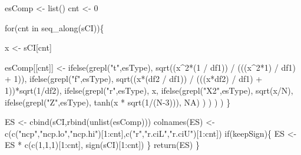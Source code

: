 \documentclass[]{article}
\newenvironment{Shaded}{\begin{snugshade}}{\end{snugshade}}
\newcommand{\KeywordTok}[1]{\textcolor[rgb]{0.94,0.87,0.69}{{#1}}}
\newcommand{\DecValTok}[1]{\textcolor[rgb]{0.86,0.86,0.80}{{#1}}}
\newcommand{\StringTok}[1]{\textcolor[rgb]{0.80,0.58,0.58}{{#1}}}
\newcommand{\OtherTok}[1]{\textcolor[rgb]{0.94,0.94,0.56}{{#1}}}
\newcommand{\NormalTok}[1]{\textcolor[rgb]{0.80,0.80,0.80}{{#1}}}
\begin{document}
\begin{Shaded}
\begin{Highlighting}[]
    \NormalTok{esComp <-}\StringTok{ }\KeywordTok{list}\NormalTok{()}
    \NormalTok{cnt <-}\StringTok{ }\DecValTok{0}

    \NormalTok{for(cnt in }\KeywordTok{seq_along}\NormalTok{(sCI))\{}

        \NormalTok{x <-}\StringTok{ }\NormalTok{sCI[cnt]}

        \NormalTok{esComp[[cnt]] <-}\StringTok{ }\KeywordTok{ifelse}\NormalTok{(}\KeywordTok{grepl}\NormalTok{(}\StringTok{"t"}\NormalTok{,esType), }\KeywordTok{sqrt}\NormalTok{((x^}\DecValTok{2}\NormalTok{*(}\DecValTok{1} \NormalTok{/}\StringTok{ }\NormalTok{df1)) /}\StringTok{ }\NormalTok{(((x^}\DecValTok{2}\NormalTok{*}\DecValTok{1}\NormalTok{) /}\StringTok{ }\NormalTok{df1) +}\StringTok{ }\DecValTok{1}\NormalTok{)),}
                                \KeywordTok{ifelse}\NormalTok{(}\KeywordTok{grepl}\NormalTok{(}\StringTok{"f"}\NormalTok{,esType), }\KeywordTok{sqrt}\NormalTok{((x*(df2 /}\StringTok{ }\NormalTok{df1)) /}\StringTok{ }\NormalTok{(((x*df2) /}\StringTok{ }\NormalTok{df1) +}\StringTok{ }\DecValTok{1}\NormalTok{))*}\KeywordTok{sqrt}\NormalTok{(}\DecValTok{1}\NormalTok{/df2),}
                                       \KeywordTok{ifelse}\NormalTok{(}\KeywordTok{grepl}\NormalTok{(}\StringTok{"r"}\NormalTok{,esType), x,}
                                              \KeywordTok{ifelse}\NormalTok{(}\KeywordTok{grepl}\NormalTok{(}\StringTok{"X2"}\NormalTok{,esType), }\KeywordTok{sqrt}\NormalTok{(x/N),}
                                                     \KeywordTok{ifelse}\NormalTok{(}\KeywordTok{grepl}\NormalTok{(}\StringTok{"Z"}\NormalTok{,esType), }\KeywordTok{tanh}\NormalTok{(x *}\StringTok{ }\KeywordTok{sqrt}\NormalTok{(}\DecValTok{1}\NormalTok{/(N}\DecValTok{-3}\NormalTok{))),}
                                                            \OtherTok{NA}\NormalTok{)}
                                              \NormalTok{)}
                                       \NormalTok{)}
                                \NormalTok{)}
        \NormalTok{)}
    \NormalTok{\}}

    \NormalTok{ES <-}\StringTok{ }\KeywordTok{cbind}\NormalTok{(sCI,}\KeywordTok{rbind}\NormalTok{(}\KeywordTok{unlist}\NormalTok{(esComp)))}
    \KeywordTok{colnames}\NormalTok{(ES) <-}\StringTok{ }\KeywordTok{c}\NormalTok{(}\KeywordTok{c}\NormalTok{(}\StringTok{"ncp"}\NormalTok{,}\StringTok{"ncp.lo"}\NormalTok{,}\StringTok{"ncp.hi"}\NormalTok{)[}\DecValTok{1}\NormalTok{:cnt],}\KeywordTok{c}\NormalTok{(}\StringTok{"r"}\NormalTok{,}\StringTok{"r.ciL"}\NormalTok{,}\StringTok{"r.ciU"}\NormalTok{)[}\DecValTok{1}\NormalTok{:cnt])}
    \NormalTok{if(keepSign)\{}
        \NormalTok{ES <-}\StringTok{ }\NormalTok{ES *}\StringTok{ }\KeywordTok{c}\NormalTok{(}\KeywordTok{c}\NormalTok{(}\DecValTok{1}\NormalTok{,}\DecValTok{1}\NormalTok{,}\DecValTok{1}\NormalTok{)[}\DecValTok{1}\NormalTok{:cnt], }\KeywordTok{sign}\NormalTok{(sCI)[}\DecValTok{1}\NormalTok{:cnt])}
    \NormalTok{\}}
    \KeywordTok{return}\NormalTok{(ES)}
\NormalTok{\}}



\end{Highlighting}
\end{Shaded}
\end{document}
